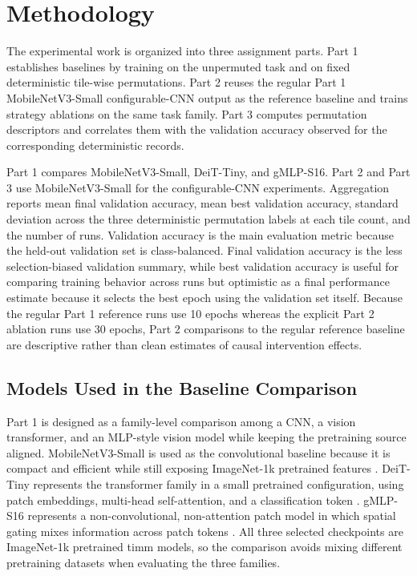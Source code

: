 \documentclass[12pt]{article}
\begin{document}
\section{Methodology}

The experimental work is organized into three assignment parts. Part 1 establishes baselines by training on the unpermuted task and on fixed deterministic tile-wise permutations. Part 2 reuses the regular Part 1 MobileNetV3-Small configurable-CNN output as the reference baseline and trains strategy ablations on the same task family. Part 3 computes permutation descriptors and correlates them with the validation accuracy observed for the corresponding deterministic records.

Part 1 compares MobileNetV3-Small, DeiT-Tiny, and gMLP-S16. Part 2 and Part 3 use MobileNetV3-Small for the configurable-CNN experiments. Aggregation reports mean final validation accuracy, mean best validation accuracy, standard deviation across the three deterministic permutation labels at each tile count, and the number of runs. Validation accuracy is the main evaluation metric because the held-out validation set is class-balanced. Final validation accuracy is the less selection-biased validation summary, while best validation accuracy is useful for comparing training behavior across runs but optimistic as a final performance estimate because it selects the best epoch using the validation set itself. Because the regular Part 1 reference runs use 10 epochs whereas the explicit Part 2 ablation runs use 30 epochs, Part 2 comparisons to the regular reference baseline are descriptive rather than clean estimates of causal intervention effects.

\subsection{Models Used in the Baseline Comparison}

Part 1 is designed as a family-level comparison among a CNN, a vision transformer, and an MLP-style vision model while keeping the pretraining source aligned. MobileNetV3-Small is used as the convolutional baseline because it is compact and efficient while still exposing ImageNet-1k pretrained features \citep{howard2019searching}. DeiT-Tiny represents the transformer family in a small pretrained configuration, using patch embeddings, multi-head self-attention, and a classification token \citep{touvron2021deit}. gMLP-S16 represents a non-convolutional, non-attention patch model in which spatial gating mixes information across patch tokens \citep{liu2021pay}. All three selected checkpoints are ImageNet-1k pretrained timm models, so the comparison avoids mixing different pretraining datasets when evaluating the three families.
\end{document}
